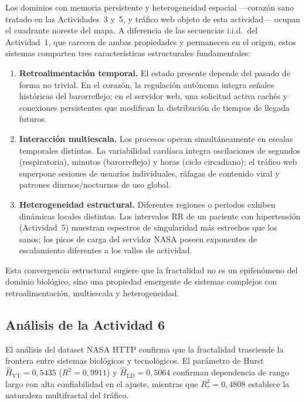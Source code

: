 Los dominios con memoria persistente y heterogeneidad espacial ---corazón sano
tratado en las Actividades~3 y~5, y tráfico web objeto de esta actividad---
ocupan el cuadrante noreste del mapa. A diferencia de las secuencias i.i.d.\ del
Actividad~1, que carecen de ambas propiedades y permanecen en el origen, estos
sistemas comparten tres características estructurales fundamentales:

\begin{enumerate}[leftmargin=2em]
    \item \textbf{Retroalimentación temporal.} El estado presente depende del
          pasado de forma no trivial. En el corazón, la regulación autónoma
          integra señales históricas del barorreflejo; en el servidor web, una
          solicitud activa cachés y conexiones persistentes que modifican la
          distribución de tiempos de llegada futuros.
    \item \textbf{Interacción multiescala.} Los procesos operan simultáneamente
          en escalas temporales distintas. La variabilidad cardíaca integra
          oscilaciones de segundos (respiratoria), minutos (barorreflejo) y
          horas (ciclo circadiano); el tráfico web superpone sesiones de
          usuarios individuales, ráfagas de contenido viral y patrones
          diurnos/nocturnos de uso global.
    \item \textbf{Heterogeneidad estructural.} Diferentes regiones o periodos
          exhiben dinámicas locales distintas. Los intervalos RR de un paciente
          con hipertensión (Actividad~5) muestran espectros de singularidad más
          estrechos que los sanos; los picos de carga del servidor NASA poseen
          exponentes de escalamiento diferentes a los valles de actividad.
\end{enumerate}

Esta convergencia estructural sugiere que la fractalidad no es un epifenómeno
del dominio biológico, sino una propiedad emergente de sistemas complejos con
retroalimentación, multiescala y heterogeneidad.

\subsection{Análisis de la Actividad 6}

El análisis del dataset NASA HTTP confirma que la fractalidad trasciende la
frontera entre sistemas biológicos y tecnológicos. El parámetro de Hurst
$\hat{H}_{\text{VT}} = 0{,}5435$ ($R^2 = 0{,}9911$) y
$\hat{H}_{\text{LD}} = 0{,}5064$ confirman dependencia de rango largo con
alta confiabilidad en el ajuste, mientras que $R^2_{\tau} = 0{,}4808$
establece la naturaleza multifractal del tráfico.

